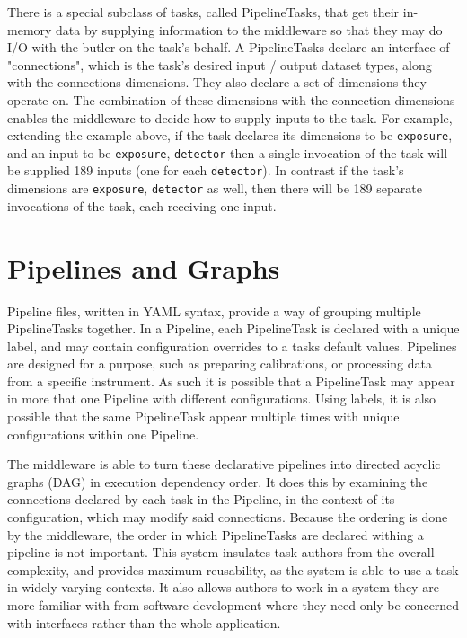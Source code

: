 \documentclass[11pt,twoside]{article}
\begin{document}
There is a special subclass of tasks, called PipelineTasks, that get their in-memory data by supplying information to the middleware so that they may do I/O with the butler on the task's behalf. A PipelineTasks declare an interface of "connections", which is the task's desired input / output dataset types, along with the connections dimensions. They also declare a set of dimensions they operate on. The combination of these dimensions with the connection dimensions enables the middleware to decide how to supply inputs to the task. For example, extending the example above, if the task declares its dimensions to be \texttt{exposure}, and an input to be \texttt{exposure}, \texttt{detector} then a single invocation of the task will be supplied 189 inputs (one for each \texttt{detector}). In contrast if the task's dimensions are \texttt{exposure}, \texttt{detector} as well, then there will be 189 separate invocations of the task, each receiving one input.

\section{Pipelines and Graphs}
Pipeline files, written in YAML syntax, provide a way of grouping multiple PipelineTasks together. In a Pipeline, each PipelineTask is declared with a unique label, and may contain configuration overrides to a tasks default values. Pipelines are designed for a purpose, such as preparing calibrations, or processing data from a specific instrument. As such it is possible that a PipelineTask may appear in more that one Pipeline with different configurations. Using labels, it is also possible that the same PipelineTask appear multiple times with unique configurations within one Pipeline.

The middleware is able to turn these declarative pipelines into directed acyclic graphs (DAG) in execution dependency order. It does this by examining the connections declared by each task in the Pipeline, in the context of its configuration, which may modify said connections. Because the ordering is done by the middleware, the order in which PipelineTasks are declared withing a pipeline is not important. This system insulates task authors from the overall complexity, and provides maximum reusability, as the system is able to use a task in widely varying contexts. It also allows authors to work in a system they are more familiar with from software development where they need only be concerned with interfaces rather than the whole application.
\end{document}
